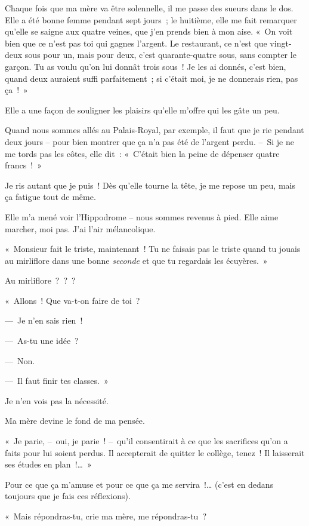 \documentclass[french,twoside]{book} %
\begin{document}
Chaque fois que ma mère va être solennelle, il me passe des sueurs dans le dos. Elle a été bonne femme pendant sept jours ; le huitième, elle me fait remarquer qu’elle se saigne aux quatre veines, que j’en prends bien à mon aise. « On voit bien que ce n’est pas toi qui gagnes l’argent. Le restaurant, ce n’est que vingt-deux sous pour un, mais pour deux, c’est quarante-quatre sous, sans compter le garçon. Tu as voulu qu’on lui donnât trois sous ! Je les ai donnés, c’est bien, quand deux auraient suffi parfaitement ; si c’était moi, je ne donnerais rien, pas ça ! »\par
Elle a une façon de souligner les plaisirs qu’elle m’offre qui les gâte un peu.\par
Quand nous sommes allés au Palais-Royal, par exemple, il faut que je rie pendant deux jours – pour bien montrer que ça n’a pas été de l’argent perdu. – Si je ne me tords pas les côtes, elle dit : « C’était bien la peine de dépenser quatre francs ! »\par
Je ris autant que je puis ! Dès qu’elle tourne la tête, je me repose un peu, mais ça fatigue tout de même.\par
\bigbreak
\noindent Elle m’a mené voir l’Hippodrome – nous sommes revenus à pied. Elle aime marcher, moi pas. J’ai l’air mélancolique.\par
« Monsieur fait le triste, maintenant ! Tu ne faisais pas le triste quand tu jouais au mirliflore dans une bonne \emph{seconde} et que tu regardais les écuyères. »\par
Au mirliflore ? ? ?\par
« Allons ! Que va-t-on faire de toi ?\par
— Je n’en sais rien !\par
— As-tu une idée ?\par
— Non.\par
— Il faut finir tes classes. »\par
Je n’en vois pas la nécessité.\par
Ma mère devine le fond de ma pensée.\par
« Je parie, – oui, je parie ! – qu’il consentirait à ce que les sacrifices qu’on a faits pour lui soient perdus. Il accepterait de quitter le collège, tenez ! Il laisserait ses études en plan !… »\par
Pour ce que ça m’amuse et pour ce que ça me servira !… (c’est en dedans toujours que je fais ces réflexions).\par
« Mais répondras-tu, crie ma mère, me répondras-tu ?\par
\end{document}
